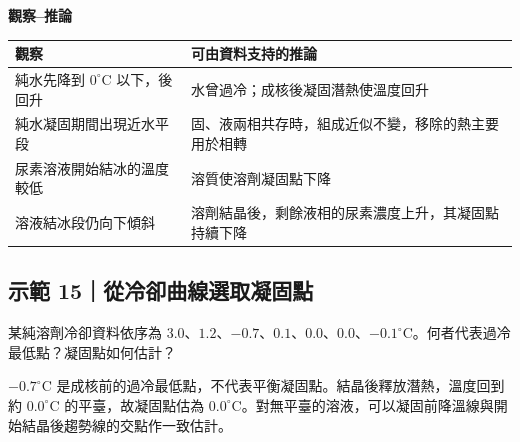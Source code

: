 \documentclass[11pt,a4paper]{article}
\newcounter{none}
\begin{document}
\textbf{觀察--推論}

{\def\LTcaptype{none} %
\begin{longtable}[]{@{}
  >{\raggedright\arraybackslash}p{}
  >{\raggedright\arraybackslash}p{}@{}}
\toprule\noalign{}
\begin{minipage}[b]{\linewidth}\raggedright
觀察
\end{minipage} & \begin{minipage}[b]{\linewidth}\raggedright
可由資料支持的推論
\end{minipage} \\
\midrule\noalign{}
\endhead
\bottomrule\noalign{}
\endlastfoot
純水先降到 \(0^\circ\mathrm C\) 以下，後回升 & 水曾過冷；成核後凝固潛熱使溫度回升 \\
純水凝固期間出現近水平段 & 固、液兩相共存時，組成近似不變，移除的熱主要用於相轉 \\
尿素溶液開始結冰的溫度較低 & 溶質使溶劑凝固點下降 \\
溶液結冰段仍向下傾斜 & 溶劑結晶後，剩餘液相的尿素濃度上升，其凝固點持續下降 \\
\end{longtable}
}

\begin{HandoutWorkedExample}

\subsection{示範 15｜從冷卻曲線選取凝固點}\label{ux793aux7bc4-15ux5f9eux51b7ux537bux66f2ux7ddaux9078ux53d6ux51ddux56faux9ede}

某純溶劑冷卻資料依序為 \(3.0\)、\(1.2\)、\(-0.7\)、\(0.1\)、\(0.0\)、\(0.0\)、\(-0.1^\circ\mathrm C\)。何者代表過冷最低點？凝固點如何估計？

\(-0.7^\circ\mathrm C\) 是成核前的過冷最低點，不代表平衡凝固點。結晶後釋放潛熱，溫度回到約 \(0.0^\circ\mathrm C\) 的平臺，故凝固點估為 \(0.0^\circ\mathrm C\)。對無平臺的溶液，可以凝固前降溫線與開始結晶後趨勢線的交點作一致估計。

\end{HandoutWorkedExample}
\end{document}
